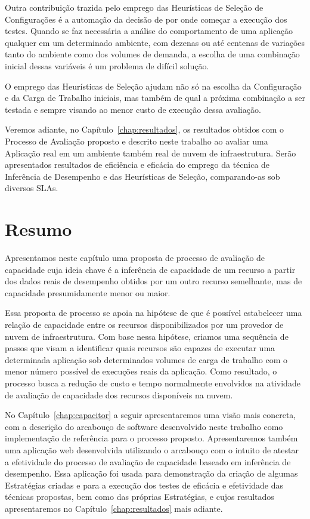 Outra contribuição trazida pelo emprego das Heurísticas de Seleção de Configurações
é a automação da decisão de por onde começar a execução dos testes. Quando se faz
necessária a análise do comportamento de uma aplicação qualquer em um determinado
ambiente, com dezenas ou até centenas de variações tanto do ambiente como dos 
volumes de demanda, a escolha de uma combinação inicial dessas variáveis é um
problema de difícil solução.

O emprego das Heurísticas de Seleção ajudam não só na escolha da Configuração e 
da Carga de Trabalho iniciais, mas também de qual a próxima combinação a ser 
testada e sempre visando ao menor custo de execução dessa avaliação.

Veremos adiante, no Capítulo~\ref{chap:resultados}, os resultados obtidos
com o Processo de Avaliação proposto e descrito neste trabalho ao avaliar uma
Aplicação real em um ambiente também real de nuvem de infraestrutura. Serão apresentados
resultados de eficiência e eficácia do emprego da técnica de Inferência de Desempenho
e das Heurísticas de Seleção, comparando-as sob diversos SLAs.

\section{Resumo}
Apresentamos neste capítulo uma proposta de processo de avaliação de capacidade
cuja ideia chave é a inferência de capacidade de um recurso a partir dos dados 
reais de desempenho obtidos por um outro recurso semelhante, mas de capacidade
presumidamente menor ou maior.

Essa proposta de processo se apoia na hipótese de que é possível estabelecer uma
relação de capacidade entre os recursos disponibilizados por um provedor de nuvem
de infraestrutura. Com base nessa hipótese, criamos uma sequência de passos que
visam a identificar quais recursos são capazes de executar uma determinada 
aplicação sob determinados volumes de carga de trabalho com o menor número
possível de execuções reais da aplicação. Como resultado, o processo busca
a redução de custo e tempo normalmente envolvidos na atividade de avaliação de
capacidade dos recursos disponíveis na nuvem.

No Capítulo~\ref{chap:capacitor} a seguir apresentaremos uma visão mais concreta, com a descrição do 
arcabouço de software desenvolvido neste trabalho como implementação de referência
para o processo proposto. Apresentaremos também uma aplicação
web desenvolvida utilizando o arcabouço com o intuito de atestar a efetividade do processo de avaliação 
de capacidade baseado em inferência de desempenho. Essa aplicação foi usada para
demonstração da criação de algumas Estratégias criadas e para a execução dos 
testes de eficácia e efetividade das técnicas propostas, bem como das próprias
Estratégias, e cujos resultados apresentaremos no Capítulo~\ref{chap:resultados}
mais adiante.
   
